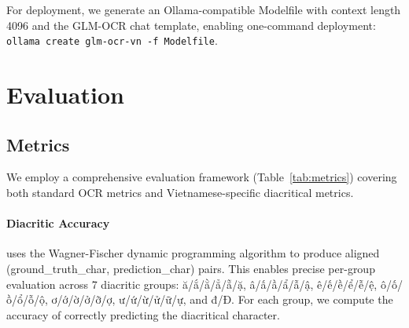 \documentclass[11pt]{article}
\begin{document}
For deployment, we generate an Ollama-compatible Modelfile with context length 4096 and the GLM-OCR chat template, enabling one-command deployment: \texttt{ollama create glm-ocr-vn -f Modelfile}.

\section{Evaluation}

\subsection{Metrics}

We employ a comprehensive evaluation framework (Table~\ref{tab:metrics}) covering both standard OCR metrics and Vietnamese-specific diacritical metrics.

\begin{table}[t]
\centering
\scriptsize
{}
\caption{Evaluation metrics for OCR quality assessment.}
\label{tab:metrics}
\end{table}

\paragraph{Diacritic Accuracy} uses the Wagner-Fischer dynamic programming algorithm to produce aligned (ground\_truth\_char, prediction\_char) pairs. 
This enables precise per-group evaluation across 7 diacritic groups: ă/ắ/ằ/ẳ/ẵ/ặ, â/ấ/ầ/ẩ/ẫ/ậ, ê/ế/ề/ể/ễ/ệ, ô/ố/ồ/ổ/ỗ/ộ, ơ/ớ/ờ/ở/ỡ/ợ, ư/ứ/ừ/ử/ữ/ự, and đ/Đ. 
For each group, we compute the accuracy of correctly predicting the diacritical character.
\end{document}
